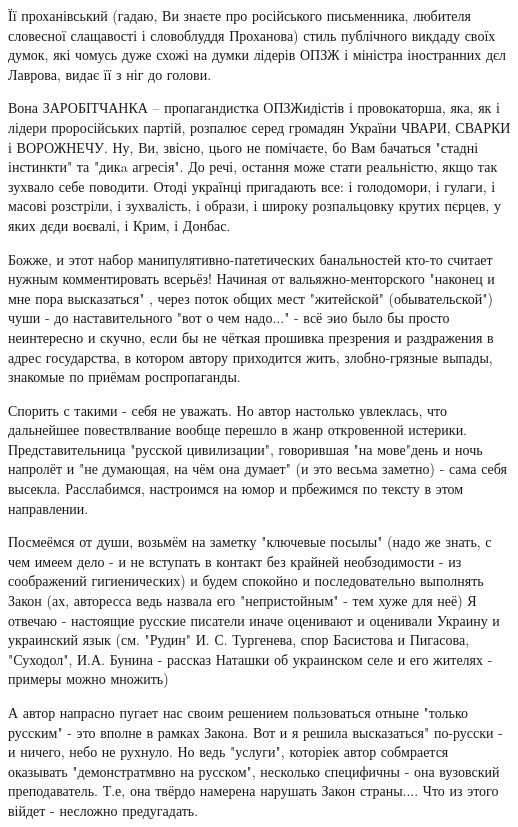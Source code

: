 \begin{itemize}
\begin{itemize}
Її проханівський (гадаю, Ви
знаєте про російського письменника, любителя словесної слащавості і словоблуддя
Проханова) стиль публічного викдаду своїх думок, які чомусь дуже схожі на думки
лідерів ОПЗЖ і міністра іностранних дєл Лаврова, видає її з ніг до голови. 

Вона ЗАРОБІТЧАНКА – пропагандистка ОПЗЖидістів і провокаторша, яка, як і лідери
проросійських партій, розпалює серед громадян України ЧВАРИ, СВАРКИ і
ВОРОЖНЕЧУ. Ну, Ви, звісно, цього не помічаєте, бо Вам бачаться "стадні
інстинкти" та "дикa агресія". До речі, остання може стати реальністю, якщо так
зухвало себе поводити. Отоді українці пригадають все: і голодомори, і гулаги, і
масові розстріли, і зухвалість, і образи, і широку розпальцовку крутих пєрцев,
у яких дєди воєвалі, і Крим, і Донбас.


Божже, и этот набор манипулятивно-патетических банальностей кто-то считает
нужным комментировать всерьёз! Начиная от вальяжно-менторского "наконец и мне
пора высказаться" , через поток общих мест "житейской" (обывательской") чуши -
до наставительного "вот о чем надо..." - всё эио было бы просто неинтересно и
скучно, если бы не чёткая прошивка презрения и раздражения в адрес государства,
в котором автору приходится жить, злобно-грязные выпады, знакомые по приёмам
роспропаганды. 

Спорить с такими - себя не уважать. Но автор настолько увлеклась, что
дальнейшее повествлвание вообще перешло в жанр откровенной истерики.
Представительница "русской цивилизации", говорившая "на мове"день и ночь
напролёт и "не думающая, на чём она думает" (и это весьма заметно) - сама себя
высекла. Расслабимся, настроимся на юмор и прбежимся по тексту в этом
направлении. 

Посмеёмся от души, возьмём на заметку "ключевые посылы" (надо же знать, с чем
имеем дело - и не вступать в контакт без крайней необзодимости - из соображений
гигиенических) и будем спокойно и последовательно выполнять Закон (ах,
авторесса ведь назвала его "непристойным" - тем хуже для неё) Я отвечаю -
настоящие русские писатели иначе оценивают и оценивали Украину и украинский
язык (см. "Рудин" И. С. Тургенева, спор Басистова и Пигасова, "Суходол", И.А.
Бунина - рассказ Наташки об украинском селе и его жителях - примеры можно
множить) 

А автор напрасно пугает нас своим решением пользоваться отныне "только русским"
- это вполне в рамках Закона. Вот и я решила высказаться" по-русски - и ничего,
небо не рухнуло. Но ведь "услуги", которіек автор собмрается оказывать
"демонстратмвно на русском", несколько специфичны - она вузовский
преподаватель. Т.е, она твёрдо намерена нарушать Закон страны.... Что из этого
війдет - несложно предугадать. 


\end{itemize}
\end{itemize}
